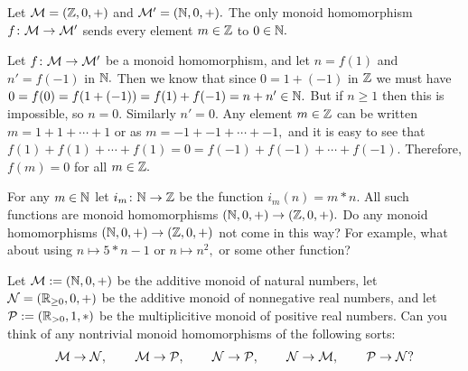 \documentclass[CT4S-EN-RU]{subfiles}
\begin{document}
\begin{exampleRUS}\label{ex:trivial monoid homomorphism}
\end{exampleRUS}

\begin{propositionENG}\label{prop:int to nat trivial}
Let $\mathcal{M}=({\mathbb Z},0,+)$ and $\mathcal{M}'=({\mathbb N},0,+).$ The only monoid homomorphism $f\colon\mathcal{M}\rightarrow\mathcal{M}'$ sends every element $m\in{\mathbb Z}$ to $0\in{\mathbb N}.$
\end{propositionENG}

\begin{propositionRUS}\label{prop:int to nat trivial}
\end{propositionRUS}

\begin{proofENG}
Let $f\colon\mathcal{M}\rightarrow\mathcal{M}'$ be a monoid homomorphism, and let $n=f(1)$ and $n'=f(-1)$ in ${\mathbb N}.$ Then we know that since $0=1+(-1)$ in ${\mathbb Z}$ we must have $0=f(0)=f(1+(-1))=f(1)+f(-1)=n+n'\in{\mathbb N}.$ But if $n\geq 1$ then this is impossible, so $n=0.$ Similarly $n'=0.$ Any element $m\in{\mathbb Z}$ can be written $m=1+1+\cdots+1$ or as $m=-1+-1+\cdots+-1,$ and it is easy to see that $f(1)+f(1)+\cdots+f(1)=0=f(-1)+f(-1)+\cdots+f(-1).$ Therefore, $f(m)=0$ for all $m\in{\mathbb Z}.$
\end{proofENG}

\begin{proofRUS}
\end{proofRUS}

\begin{exerciseENG}
For any $m\in{\mathbb N}$ let $i_m\colon{\mathbb N}\rightarrow{\mathbb Z}$ be the function $i_m(n)=m*n.$ All such functions are monoid homomorphisms $({\mathbb N},0,+)\rightarrow({\mathbb Z},0,+).$ Do any monoid homomorphisms $({\mathbb N},0,+)\rightarrow({\mathbb Z},0,+)$ not come in this way? For example, what about using $n\mapsto 5*n-1$ or $n\mapsto n^2,$ or some other function?
\end{exerciseENG}

\begin{exerciseRUS}
\end{exerciseRUS}

\begin{exerciseENG}
Let $\mathcal{M}:=({\mathbb N},0,+)$ be the additive monoid of natural numbers, let $\mathcal{N}=({\mathbb R}_{\geq0},0,+)$ be the additive monoid of nonnegative real numbers, and let $\mathcal{P}:=({\mathbb R}_{>0},1,*)$ be the multiplicitive monoid of positive real numbers. Can you think of any nontrivial monoid homomorphisms of the following sorts: $$\mathcal{M}\rightarrow\mathcal{N},\hspace{.3in}\mathcal{M}\rightarrow\mathcal{P},\hspace{.3in}\mathcal{N}\rightarrow\mathcal{P},\hspace{.3in} \mathcal{N}\rightarrow\mathcal{M},\hspace{.3in}\mathcal{P}\rightarrow\mathcal{N}?$$
\end{exerciseENG}
\end{document}
